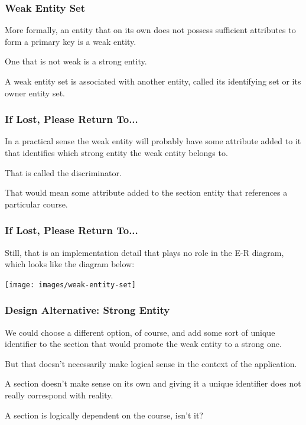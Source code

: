 \begin{frame}
\frametitle{Weak Entity Set}

More formally, an entity that on its own does not possess sufficient attributes to form a primary key is a weak entity. 

One that is not weak is a strong entity. 

A weak entity set is associated with another entity, called its identifying set or its owner entity set.

\end{frame}



\begin{frame}
\frametitle{If Lost, Please Return To...}

In a practical sense the weak entity will probably have some attribute added to it that identifies which strong entity the weak entity belongs to. 

That is called the \alert{discriminator}. 

That would mean some attribute added to the section entity that references a particular course. 

\end{frame}



\begin{frame}
\frametitle{If Lost, Please Return To...}


Still, that is an implementation detail that plays no role in the E-R diagram, which looks like the diagram below:

\begin{center}
\texttt{[image: images/weak-entity-set]}
\end{center}


\end{frame}


\begin{frame}
\frametitle{Design Alternative: Strong Entity}

We could choose a different option, of course, and add some sort of unique identifier to the section that would promote the weak entity to a strong one. 

But that doesn't necessarily make logical sense in the context of the application. 

A section doesn't make sense on its own and giving it a unique identifier does not really correspond with reality. 

A section is logically dependent on the course, isn't it?


\end{frame}



